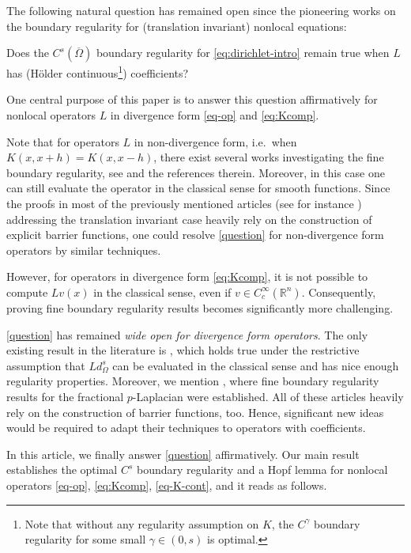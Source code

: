 \documentclass[11pt,reqno]{amsart}
\theoremstyle{plain}
\theoremstyle{definition}
\numberwithin{equation}{section}
\newcommand{\R}{\mathbb{R}}
\newcommand{\1}{\mathbbm{1}}
\begin{document}
The following natural question has remained open since the pioneering works \cite{RoSe14,Gru15,RoSe16b} on the boundary regularity for (translation invariant) nonlocal equations:
\begin{question}\label{question}
Does the $C^s(\overline{\Omega})$ boundary regularity for \eqref{eq:dirichlet-intro} remain true when $L$ has (H\"older continuous\footnote{Note that without any regularity assumption on $K$, the $C^{\gamma}$ boundary regularity for some small $\gamma \in (0,s)$ is optimal.}) coefficients?
\end{question}
One central purpose of this paper is to answer this question affirmatively for nonlocal operators $L$ in divergence form \eqref{eq-op} and \eqref{eq:Kcomp}.

Note that for operators $L$ in non-divergence form, i.e.\ when $K(x,x+h) = K(x,x-h)$, there exist several works investigating the fine boundary regularity, see \cite{Gru15,AbGr23} and the references therein. Moreover, in this case one can still evaluate the operator in the classical sense for smooth functions. Since the proofs in most of the previously mentioned articles (see for instance \cite{RoSe16,RoSe16b,RoSe17,RoWe24}) addressing the translation invariant case heavily rely on the construction of explicit barrier functions, one could resolve \autoref{question} for non-divergence form operators by similar techniques. 

However, for operators in divergence form \eqref{eq:Kcomp}, it is not possible to compute $Lv(x)$ in the classical sense, even if $v \in C_c^{\infty}(\R^n)$. Consequently, proving fine boundary regularity results becomes significantly more challenging. 

\autoref{question} has remained \textit{wide open for divergence form operators}. The only existing result in the literature is \cite{Fal19}, which holds true under the restrictive assumption that $L d_{\Omega}^s$ can be evaluated in the classical sense and has nice enough regularity properties. Moreover, we mention \cite{IMS16,IMS20,IaMo24}, where fine boundary regularity results for the fractional $p$-Laplacian were established. All of these articles heavily rely on the construction of barrier functions, too. Hence, significant new ideas would be required to adapt their techniques to operators with coefficients.


In this article, we finally answer \autoref{question} affirmatively. Our main result establishes the optimal $C^s$ boundary regularity and a Hopf lemma for nonlocal operators \eqref{eq-op}, \eqref{eq:Kcomp}, \eqref{eq-K-cont}, and it reads as follows. 
\end{document}
